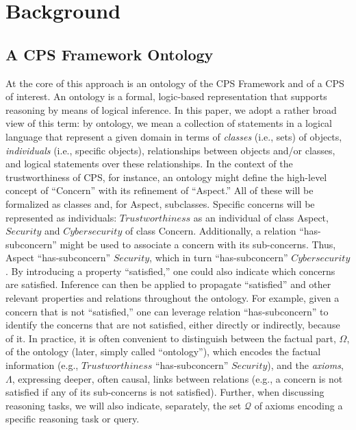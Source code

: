 \section{Background}
%
\subsection{A CPS Framework Ontology}
\label{sub-section:CPS_ontology}
%
At the core of this approach is an ontology of the CPS Framework and of a CPS of interest. An ontology is a formal, logic-based representation that supports reasoning by means of logical inference. In this paper, we adopt a rather broad view of this term: by ontology, we mean a collection of statements in a logical language that represent a given domain in terms of \emph{classes} (i.e., sets) of objects, \emph{individuals} (i.e., specific objects), relationships between objects and/or classes, and logical statements over these relationships.
In the context of the trustworthiness of CPS, for instance, an ontology might define the high-level concept of ``Concern'' with its refinement of ``Aspect.'' All of these will be formalized as classes and, for Aspect, subclasses. Specific concerns will be represented as individuals: $T\!rustworthiness$ as an individual of class Aspect, $Security$ and $Cybersecurity$ of class Concern.
Additionally, a relation ``has-subconcern'' might be used to associate a concern with its sub-concerns. Thus, Aspect ``has-subconcern'' $Security$, which in turn ``has-subconcern'' $Cybersecurity$. By introducing a property ``satisfied,'' one could also indicate which concerns are satisfied. 
%
Inference can then be applied to propagate ``satisfied'' and other relevant properties and relations throughout the ontology. For example, given a concern that is not ``satisfied,'' one can leverage relation ``has-subconcern'' to identify the concerns that are not satisfied, either directly or indirectly, because of it. 
%
In practice, it is often convenient to distinguish between the factual part, $\Omega$, of the ontology (later, simply called ``ontology''), which encodes the factual information (e.g., $T\!rustworthiness$ ``has-subconcern'' $Security$), and the \emph{axioms}, $\Lambda$, expressing deeper, often causal, links between relations (e.g., a concern is not satisfied if any of its sub-concerns is not satisfied). Further, when discussing reasoning tasks, we will also indicate, separately, the set $\mathcal{Q}$ of axioms encoding a specific reasoning task or query.
%
